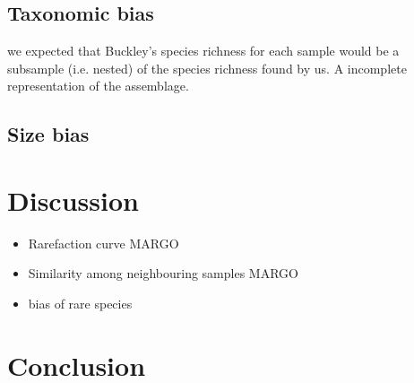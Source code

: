 \documentclass[a4paper]{article}
\begin{document}
	\subsection{Taxonomic bias} we expected that Buckley's species richness for each sample would be a subsample (i.e. nested) of the species richness found by us. A incomplete representation of the assemblage.

	\subsection{Size bias}






\section{Discussion}

\begin{itemize}
\item Rarefaction curve MARGO
\item Similarity among neighbouring samples MARGO
\item bias of rare species
\end{itemize}





\section{Conclusion}





\label{Bibliography}
\end{document}
